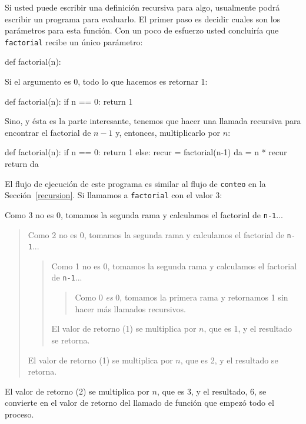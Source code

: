  

Si usted puede escribir una definición recursiva para algo, usualmente
podrá escribir un programa para evaluarlo. El primer paso es decidir
cuales son los parámetros para esta función. Con un poco de esfuerzo
usted concluiría que \texttt{factorial} recibe un único parámetro:

\begin{pythoncode}
def factorial(n):
\end{pythoncode}

Si el argumento es 0, todo lo que hacemos es retornar 1:

\begin{pythoncode}
def factorial(n):
  if n == 0:
    return 1
\end{pythoncode}
 

Sino, y ésta es la parte interesante, tenemos que hacer una llamada
recursiva para encontrar el factorial de $n-1$ y, entonces, multiplicarlo
por $n$:
\begin{pythoncode}
def factorial(n):
  if n == 0:
    return 1
  else:
    recur = factorial(n-1)
    da = n * recur
    return da
\end{pythoncode}

El flujo de ejecución de este programa es similar al flujo de \texttt{conteo}
en la Sección~\ref{recursion}. Si llamamos a \texttt{factorial}
con el valor 3:


Como 3 no es 0, tomamos la segunda rama y calculamos el factorial
de \texttt{n-1}...
\begin{quote}
Como 2 no es 0, tomamos la segunda rama y calculamos el factorial
de \texttt{n-1}...

\begin{quote}
Como 1 no es 0, tomamos la segunda rama y calculamos el factorial
de \texttt{n-1}...

\begin{quote}
Como 0 {\em es} 0, tomamos la primera rama y retornamos 1 sin hacer
más llamados recursivos. 
\end{quote}
El valor de retorno (1) se multiplica por $n$, que es 1, y el resultado
se retorna. 
\end{quote}
El valor de retorno (1) se multiplica por $n$, que es 2, y el resultado
se retorna. 
\end{quote}
El valor de retorno (2) se multiplica por $n$, que es 3, y el resultado,
6, se convierte en el valor de retorno del llamado de función que
empezó todo el proceso.

